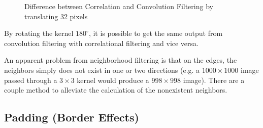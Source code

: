 \documentclass[twoside,a4paper,article]{combine}
\begin{document}
\begin{minipage}{\textwidth}\begin{figure}[H]
    \captionsetup{justification=centering}
    \centering
    \caption{Difference between Correlation and Convolution Filtering by translating 32 pixels}
\end{figure}\end{minipage}

By rotating the kernel $180^\circ$, it is possible to get the same output from convolution filtering with correlational filtering and vice versa\cite{Gonzalez_Woods_2018}.

An apparent problem from neighborhood filtering is that on the edges, the neighbors simply does not exist in one or two directions 
(e.g. a $1000\times1000$ image passed through a $3\times3$ kernel would produce a $998\times998$ image). 
There are a couple method to alleviate the calculation of the nonexistent neighbors.

\subsection{Padding (Border Effects)}
\end{document}
